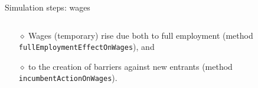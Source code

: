 \documentclass[9pt]{beamer}
\begin{document}
\begin{frame}[fragile]{Simulation steps: wages}

\begin{columns}[T]
\begin{column}{.7\textwidth}
\begin{block}{}


\begin{itemize}
\item[$\diamond$] Wages (temporary) rise due both to full employment (method \verb|fullEmploymentEffectOnWages|), and 
\item[$\diamond$] to the creation of barriers against new entrants (method \verb|incumbentActionOnWages|). 
\end{itemize}    
     
\end{block}
\end{column}

 \begin{column}{.3\textwidth}
 \vspace{-7.5\baselineskip}
 \begin{block}{}
  \end{block}
  \end{column}
    
\end{columns}

\end{frame}

\end{document}
